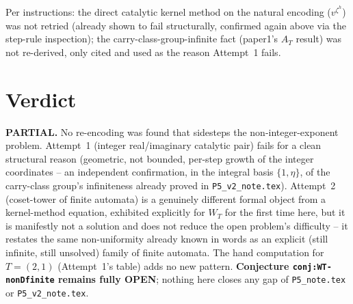 \documentclass[11pt]{article}
\begin{document}
Per instructions: the direct catalytic kernel method on the natural encoding
($v^{\zeta^h}$) was not retried (already shown to fail structurally, confirmed again above via the
step-rule inspection); the carry-class-group-infinite fact (paper1's $A_T$ result) was not
re-derived, only cited and used as the reason Attempt~1 fails.

\section{Verdict}

\textbf{PARTIAL.} No re-encoding was found that sidesteps the non-integer-exponent problem.
Attempt~1 (integer real/imaginary catalytic pair) fails for a clean structural reason (geometric,
not bounded, per-step growth of the integer coordinates -- an independent confirmation, in the
integral basis $\{1,\eta\}$, of the carry-class group's infiniteness already proved in
\texttt{P5\_v2\_note.tex}). Attempt~2 (coset-tower of finite automata) is a genuinely different
formal object from a kernel-method equation, exhibited explicitly for $W_T$ for the first time
here, but it is manifestly not a solution and does not reduce the open problem's difficulty -- it
restates the same non-uniformity already known in words as an explicit (still infinite, still
unsolved) family of finite automata. The hand computation for $T=(2,1)$ (Attempt~1's table) adds no
new pattern. \textbf{Conjecture \texttt{conj:WT-nonDfinite} remains fully OPEN}; nothing here closes
any gap of \texttt{P5\_note.tex} or \texttt{P5\_v2\_note.tex}.
\end{document}
